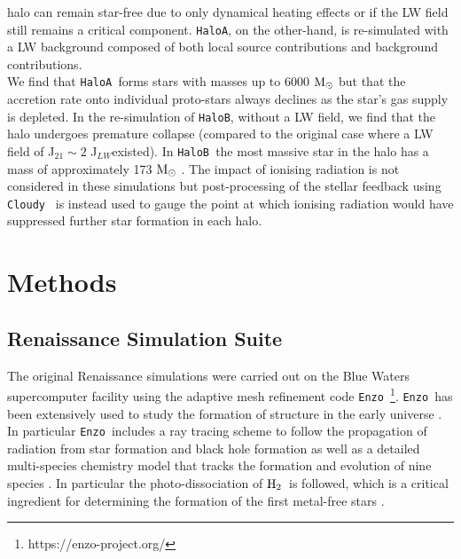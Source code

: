 \documentclass[graphics, twocolumn, usenatbib]{mn2e}
\newcommand{\enzo}{\texttt{Enzo~}}
\newcommand{\cloudy}{\texttt{Cloudy~}}
\newcommand{\msolar} {$\rm{M_{\odot}}~$}
\newcommand{\molH} {$\rm{H_2}$~}
\newcommand{\JLW} {J$_{LW}$}
\newcommand{\ha} {\texttt{HaloA~}}
\newcommand{\hb} {\texttt{HaloB~}}
\newcommand{\hac} {\texttt{HaloA}}
\newcommand{\hbc} {\texttt{HaloB}}
\begin{document}
  halo can remain star-free due to only dynamical heating effects or if the LW field still
  remains a critical component. \hac, on the other-hand, is re-simulated with a LW background
  composed of both local source contributions and background contributions. \\
  \indent We find that \ha forms stars with masses up to 6000 \msolar but that the accretion
  rate onto individual proto-stars always declines as the star's gas supply is depleted. In the
  re-simulation of \hbc, without a LW field, we find that the halo undergoes premature collapse
  (compared to the original case where a LW field of J$_{21} \sim 2$ \JLW existed). In \hb the
  most massive star in the halo has a mass of approximately 173 \msolar. The impact of ionising
  radiation is not considered in these simulations but post-processing of the stellar feedback
  using \cloudy \citep{Ferland_2017} is instead used to gauge the point at which ionising radiation
  would have suppressed further star formation in each halo. 
  
  
\section{Methods} \label{Sec:Methods}


\subsection{Renaissance Simulation Suite} \label{Sec:Renaissance}
The original Renaissance simulations were carried out on the Blue Waters supercomputer facility
using the adaptive mesh refinement code \enzo\citep{Enzo_2014, Enzo_2019}\footnote{https://enzo-project.org/}.
\enzo has been extensively used to study the formation of structure in the early universe
\citep{Abel_2002, OShea_2005b, Turk_2012, Wise_2012b, Wise_2014, Regan_2015, Regan_2017}.
In particular \enzo includes a ray tracing scheme to follow the propagation of radiation from
star formation and black hole formation \citep{WiseAbel_2011} as well as a detailed multi-species
chemistry model that tracks the formation and evolution of nine species \citep{Anninos_1997,
  Abel_1997}. In particular the photo-dissociation of \molH is followed, which is a critical
ingredient for determining the formation of the first metal-free stars \citep{Abel_2000}. 
\end{document}
